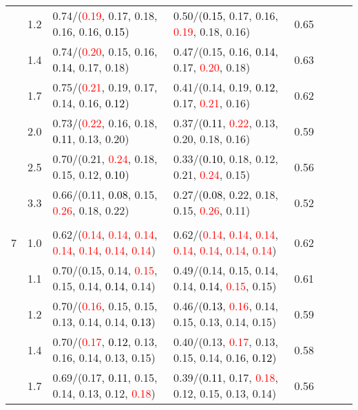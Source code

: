\documentclass[10pt,a4paper]{report}
\begin{document}
\begin{table}[!htbp]
\begin{center}
{\begin{tabular}{ccllcccc}
			&1.2&0.74/(\textcolor{red}{0.19}, 0.17, 0.18, 0.16, 0.16, \textcolor{black}{0.15})&0.50/(\textcolor{black}{0.15}, 0.17, 0.16, \textcolor{red}{0.19}, 0.18, 0.16)&0.65\\
			&1.4&0.74/(\textcolor{red}{0.20}, 0.15, 0.16, \textcolor{black}{0.14}, 0.17, 0.18)&0.47/(0.15, 0.16, \textcolor{black}{0.14}, 0.17, \textcolor{red}{0.20}, 0.18)&0.63\\
			&1.7&0.75/(\textcolor{red}{0.21}, 0.19, 0.17, 0.14, 0.16, \textcolor{black}{0.12})&0.41/(0.14, 0.19, \textcolor{black}{0.12}, 0.17, \textcolor{red}{0.21}, 0.16)&0.62\\
			&2.0&0.73/(\textcolor{red}{0.22}, 0.16, 0.18, \textcolor{black}{0.11}, 0.13, 0.20)&0.37/(\textcolor{black}{0.11}, \textcolor{red}{0.22}, 0.13, 0.20, 0.18, 0.16)&0.59\\
			&2.5&0.70/(0.21, \textcolor{red}{0.24}, 0.18, 0.15, 0.12, \textcolor{black}{0.10})&0.33/(\textcolor{black}{0.10}, 0.18, 0.12, 0.21, \textcolor{red}{0.24}, 0.15)&0.56\\
			&3.3&0.66/(0.11, \textcolor{black}{0.08}, 0.15, \textcolor{red}{0.26}, 0.18, 0.22)&0.27/(\textcolor{black}{0.08}, 0.22, 0.18, 0.15, \textcolor{red}{0.26}, 0.11)&0.52\\
			&&&&\\
			7			&1.0&0.62/(\textcolor{red}{0.14}, \textcolor{red}{0.14}, \textcolor{red}{0.14}, \textcolor{red}{0.14}, \textcolor{red}{0.14}, \textcolor{red}{0.14}, \textcolor{red}{0.14})&0.62/(\textcolor{red}{0.14}, \textcolor{red}{0.14}, \textcolor{red}{0.14}, \textcolor{red}{0.14}, \textcolor{red}{0.14}, \textcolor{red}{0.14}, \textcolor{red}{0.14})&0.62\\
			&1.1&0.70/(0.15, 0.14, \textcolor{red}{0.15}, 0.15, 0.14, \textcolor{black}{0.14}, 0.14)&0.49/(0.14, 0.15, 0.14, 0.14, \textcolor{black}{0.14}, \textcolor{red}{0.15}, 0.15)&0.61\\
			&1.2&0.70/(\textcolor{red}{0.16}, 0.15, 0.15, 0.13, 0.14, 0.14, \textcolor{black}{0.13})&0.46/(\textcolor{black}{0.13}, \textcolor{red}{0.16}, 0.14, 0.15, 0.13, 0.14, 0.15)&0.59\\
			&1.4&0.70/(\textcolor{red}{0.17}, \textcolor{black}{0.12}, 0.13, 0.16, 0.14, 0.13, 0.15)&0.40/(0.13, \textcolor{red}{0.17}, 0.13, 0.15, 0.14, 0.16, \textcolor{black}{0.12})&0.58\\
			&1.7&0.69/(0.17, \textcolor{black}{0.11}, 0.15, 0.14, 0.13, 0.12, \textcolor{red}{0.18})&0.39/(\textcolor{black}{0.11}, 0.17, \textcolor{red}{0.18}, 0.12, 0.15, 0.13, 0.14)&0.56\\

\end{tabular}}
\end{center}
\end{table}
\end{document}
